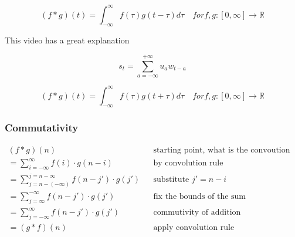 \documentclass[11pt]{article}
\begin{document}
\begin{definition}
    \begin{equation}
        (f \ast g)(t) = \int^\infty_{-\infty} f(\tau)g(t-\tau) d\tau \quad for f,g:[0,\infty] \rightarrow \mathbb{R}
    \end{equation}
\end{definition}

This video has a great explanation~\cite{youtubeConvolutionsProbability}

\begin{definition}
    \begin{equation}
        s_t = \sum_{a=-\infty}^{+\infty}u_a w_{t-a}
    \end{equation}
\end{definition}

\begin{definition}[Correlation]
    \begin{equation}
        (f \ast g)(t) = \int^\infty_{-\infty} f(\tau)g(t+\tau) d\tau \quad for f,g:[0,\infty] \rightarrow \mathbb{R}
    \end{equation}
\end{definition}

\subsubsection{Commutativity}

\begin{definition}
    \begin{align*}
        (f\ast g)(n)                                           &  & \text{starting point, what is the convoution at position n?} \\
        = \sum^\infty_{i=-\infty}f(i) \cdot g(n-i)             &  & \text{by convolution rule}                                   \\
        = \sum^{j=n-\infty}_{j=n-(-\infty)}f(n-j') \cdot g(j') &  & \text{substitute } j'=n-i                                    \\
        = \sum^{-\infty}_{j=\infty}f(n-j') \cdot g(j')         &  & \text{fix the bounds of the sum}                             \\
        = \sum^\infty_{j=-\infty}f(n-j') \cdot g(j')           &  & \text{commutivity of addition}                               \\
        = (g*f)(n)                                             &  & \text{apply convolution rule}
    \end{align*}
\end{definition}
\end{document}
